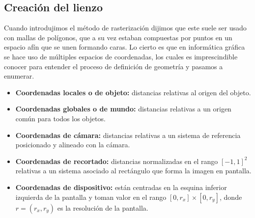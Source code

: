 \subsection{Creación del lienzo}\label{sec:lienzo} 
Cuando introdujimos el método de rasterización dijimos que este suele ser usado con mallas de polígonos, que a su vez estaban compuestas por puntos en un espacio afín que se unen formando caras. Lo cierto es que en informática gráfica se hace uso de múltiples espacios de coordenadas, los cuales es imprescindible conocer para entender el proceso de definición de geometría y pasamos a enumerar.
\begin{itemize}
    \item \textbf{Coordenadas locales o de objeto:} distancias relativas al origen del objeto.
    \item \textbf{Coordenadas globales o de mundo:} distancias relativas a un origen común para todos los objetos.
    \item \textbf{Coordenadas de cámara:} distancias relativas a un sistema de referencia posicionado y alineado con la cámara.
    \item \textbf{Coordenadas de recortado:} distancias normalizadas en el rango $[-1,1]^2$ relativas a un sistema asociado al rectángulo que forma la imagen en pantalla.
    \item \textbf{Coordenadas de dispositivo:} están centradas en la esquina inferior izquierda de la pantalla y toman valor en el rango $[0,r_x]\times [0,r_y]$, donde $r=(r_x,r_y)$ es la resolución de la pantalla.
\end{itemize}


